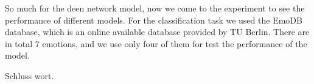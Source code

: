 \begin{frame}
 So much for the deen network model, now we come to the experiment to see the performance of different models.
 For the classification task we used the EmoDB database, which is an online available database provided by TU Berlin. There are in total 7 emotions, and we use only four of them for test the performance of the model. 
\end{frame}

\begin{frame}
 Schluss wort.
\end{frame}




%

